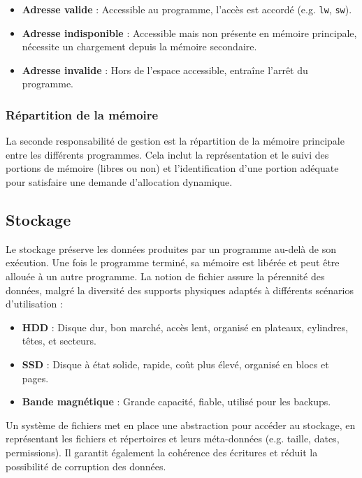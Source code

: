 \begin{itemize}
    \item \textbf{Adresse valide} : Accessible au programme, l'accès est accordé (e.g. \texttt{lw}, \texttt{sw}).
    \item \textbf{Adresse indisponible} : Accessible mais non présente en mémoire principale, nécessite un chargement depuis la mémoire secondaire.
    \item \textbf{Adresse invalide} : Hors de l'espace accessible, entraîne l'arrêt du programme.
\end{itemize}



\subsubsection{Répartition de la mémoire}

La seconde responsabilité de gestion est la répartition de la mémoire principale entre les différents programmes. 
Cela inclut la représentation et le suivi des portions de mémoire (libres ou non) et l'identification d'une portion adéquate pour satisfaire une demande d'allocation dynamique.

\subsection{Stockage}

Le stockage préserve les données produites par un programme au-delà de son exécution. Une fois le programme terminé, sa mémoire est libérée et peut être allouée à un autre programme. 
La notion de fichier assure la pérennité des données, malgré la diversité des supports physiques adaptés à différents scénarios d’utilisation :

\begin{itemize}
    \item \textbf{HDD} : Disque dur, bon marché, accès lent, organisé en plateaux, cylindres, têtes, et secteurs.
    \item \textbf{SSD} : Disque à état solide, rapide, coût plus élevé, organisé en blocs et pages.
    \item \textbf{Bande magnétique} : Grande capacité, fiable, utilisé pour les backups.
\end{itemize}

Un système de fichiers met en place une abstraction pour accéder au stockage, en représentant les fichiers et répertoires et leurs méta-données (e.g. taille, dates, permissions). 
Il garantit également la cohérence des écritures et réduit la possibilité de corruption des données.

